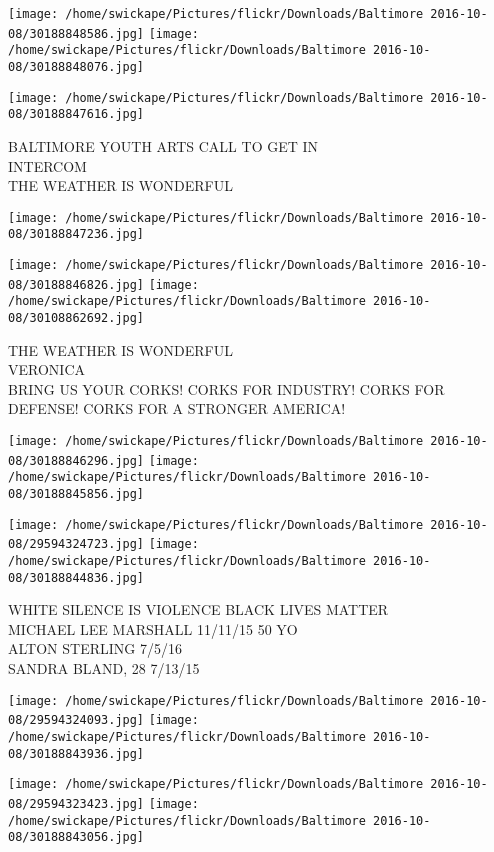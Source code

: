 \documentclass[10pt,letterpaper]{article}
\begin{document}
\texttt{[image: /home/swickape/Pictures/flickr/Downloads/Baltimore 2016-10-08/30188848586.jpg]}
\texttt{[image: /home/swickape/Pictures/flickr/Downloads/Baltimore 2016-10-08/30188848076.jpg]}

\vspace{0.25in}
\texttt{[image: /home/swickape/Pictures/flickr/Downloads/Baltimore 2016-10-08/30188847616.jpg]}

BALTIMORE YOUTH ARTS CALL TO GET IN\\
INTERCOM\\
THE WEATHER IS WONDERFUL
\pagebreak

\texttt{[image: /home/swickape/Pictures/flickr/Downloads/Baltimore 2016-10-08/30188847236.jpg]}

\vspace{0.25in}
\texttt{[image: /home/swickape/Pictures/flickr/Downloads/Baltimore 2016-10-08/30188846826.jpg]}
\texttt{[image: /home/swickape/Pictures/flickr/Downloads/Baltimore 2016-10-08/30108862692.jpg]}

THE WEATHER IS WONDERFUL\\
VERONICA\\
BRING US YOUR CORKS!  CORKS FOR INDUSTRY!  CORKS FOR DEFENSE!  CORKS FOR A STRONGER AMERICA!
\pagebreak

\texttt{[image: /home/swickape/Pictures/flickr/Downloads/Baltimore 2016-10-08/30188846296.jpg]}
\texttt{[image: /home/swickape/Pictures/flickr/Downloads/Baltimore 2016-10-08/30188845856.jpg]}

\texttt{[image: /home/swickape/Pictures/flickr/Downloads/Baltimore 2016-10-08/29594324723.jpg]}
\texttt{[image: /home/swickape/Pictures/flickr/Downloads/Baltimore 2016-10-08/30188844836.jpg]}

WHITE SILENCE IS VIOLENCE BLACK LIVES MATTER\\
MICHAEL LEE MARSHALL 11/11/15 50 YO\\
ALTON STERLING 7/5/16\\
SANDRA BLAND, 28 7/13/15
\pagebreak

\texttt{[image: /home/swickape/Pictures/flickr/Downloads/Baltimore 2016-10-08/29594324093.jpg]}
\texttt{[image: /home/swickape/Pictures/flickr/Downloads/Baltimore 2016-10-08/30188843936.jpg]}

\texttt{[image: /home/swickape/Pictures/flickr/Downloads/Baltimore 2016-10-08/29594323423.jpg]}
\texttt{[image: /home/swickape/Pictures/flickr/Downloads/Baltimore 2016-10-08/30188843056.jpg]}
\end{document}
